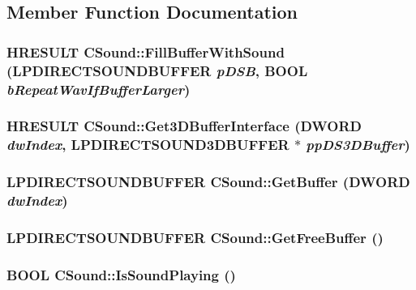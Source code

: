 \subsection{Member Function Documentation}
\hypertarget{class_c_sound_a5591cb7ebe3a9cb04e2a57fba3462510}{
\subsubsection[{FillBufferWithSound}]{\setlength{\rightskip}{0pt plus 5cm}HRESULT CSound::FillBufferWithSound (LPDIRECTSOUNDBUFFER {\em pDSB}, \/  BOOL {\em bRepeatWavIfBufferLarger})}}
\label{class_c_sound_a5591cb7ebe3a9cb04e2a57fba3462510}
\hypertarget{class_c_sound_a8cc12b7a0c95af64112dd511b93fff79}{
\subsubsection[{Get3DBufferInterface}]{\setlength{\rightskip}{0pt plus 5cm}HRESULT CSound::Get3DBufferInterface (DWORD {\em dwIndex}, \/  LPDIRECTSOUND3DBUFFER $\ast$ {\em ppDS3DBuffer})}}
\label{class_c_sound_a8cc12b7a0c95af64112dd511b93fff79}
\hypertarget{class_c_sound_a74133e53b2e5393eef4048036c9d2d61}{
\subsubsection[{GetBuffer}]{\setlength{\rightskip}{0pt plus 5cm}LPDIRECTSOUNDBUFFER CSound::GetBuffer (DWORD {\em dwIndex})}}
\label{class_c_sound_a74133e53b2e5393eef4048036c9d2d61}
\hypertarget{class_c_sound_a270ce46e674cb5f39fecfbbee8f45b41}{
\subsubsection[{GetFreeBuffer}]{\setlength{\rightskip}{0pt plus 5cm}LPDIRECTSOUNDBUFFER CSound::GetFreeBuffer ()}}
\label{class_c_sound_a270ce46e674cb5f39fecfbbee8f45b41}
\hypertarget{class_c_sound_ae4677b9565a96892a3a494698392670b}{
\subsubsection[{IsSoundPlaying}]{\setlength{\rightskip}{0pt plus 5cm}BOOL CSound::IsSoundPlaying ()}}
